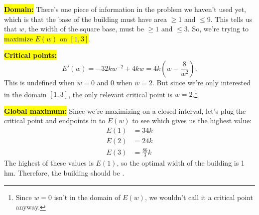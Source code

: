 \documentclass{article}
\newcommand{\highlight}[1]{\boldmath\hl{\textbf{#1}}\unboldmath}
\theoremstyle{theorem}
\begin{document}
\begin{enumerate}
\begin{solution}
    \highlight{Domain:} There's one piece of information in the problem we haven't used yet, which is that the base of the building must have area $\geq 1$ and $\leq 9$. This tells us that $w$, the width of the square base, must be $\geq 1$ and $\leq 3$. So, we're trying to \hl{maximize $E(w)$ on $[1, 3]$}.

    \highlight{Critical points:}
    \[ E'(w) = - 32 k w^{-2} + 4 kw = 4k \left( w - \frac{8}{w^2} \right).\] This is undefined when $w = 0$ and 0 when $w = 2$. But since we're only interested in the domain $[1, 3]$, the only relevant critical point is $w = 2$.\footnote{Since $w = 0$ isn't in the domain of $E(w)$, we wouldn't call it a critical point anyway.}

    \highlight{Global maximum:} Since we're maximizing on a closed interval, let's plug the critical point and endpoints in to $E(w)$ to see which gives us the highest value:
    \begin{align*}
      E(1) &= 34 k \\
      E(2) &= 24k \\
      E(3) &= \frac{86}{3} k
    \end{align*}
    The highest of these values is $E(1)$, so the optimal width of the building is 1 hm. Therefore, the building should be .
  \end{solution}

\end{enumerate}
\end{document}
